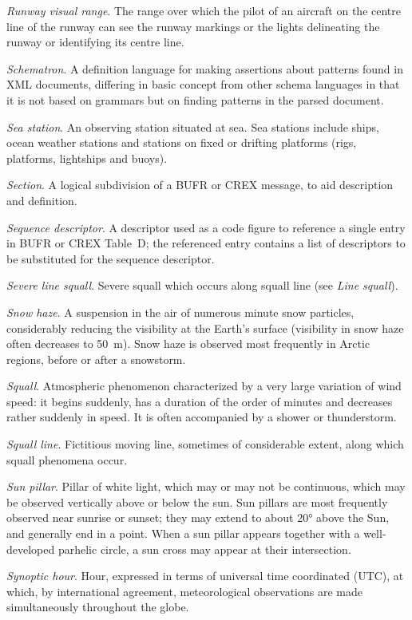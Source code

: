 \emph{Runway visual range}. The range over which the pilot of an aircraft on the centre line of the runway can see the runway markings or the lights delineating the runway or identifying its centre line.

\emph{Schematron}. A definition language for making assertions about patterns found in XML documents, differing in basic concept from other schema languages in that it is not based on grammars but on finding patterns in the parsed document.

\emph{Sea station}. An observing station situated at sea. Sea stations include ships, ocean weather stations and stations on fixed or drifting platforms (rigs, platforms, lightships and buoys).

\emph{Section}. A logical subdivision of a BUFR or CREX message, to aid description and definition.

\emph{Sequence descriptor}. A descriptor used as a code figure to reference a single entry in BUFR or CREX Table~D; the referenced entry contains a list of descriptors to be substituted for the sequence descriptor.

\emph{Severe line squall}. Severe squall which occurs along squall line (see \emph{Line squall}).

\emph{Snow haze}. A suspension in the air of numerous minute snow particles, considerably reducing the visibility at the Earth's surface (visibility in snow haze often decreases to 50~m). Snow haze is observed most frequently in Arctic regions, before or after a snowstorm.

\emph{Squall}. Atmospheric phenomenon characterized by a very large variation of wind speed: it begins suddenly, has a duration of the order of minutes and decreases rather suddenly in speed. It is often accompanied by a shower or thunderstorm.

\emph{Squall line}. Fictitious moving line, sometimes of considerable extent, along which squall phenomena occur.

\emph{Sun pillar}. Pillar of white light, which may or may not be continuous, which may be observed vertically above or below the sun. Sun pillars are most frequently observed near sunrise or sunset; they may extend to about 20° above the Sun, and generally end in a point. When a sun pillar appears together with a well-developed parhelic circle, a sun cross may appear at their intersection.

\emph{Synoptic hour}. Hour, expressed in terms of universal time coordinated (UTC), at which, by international agreement, meteorological observations are made simultaneously throughout the globe.

